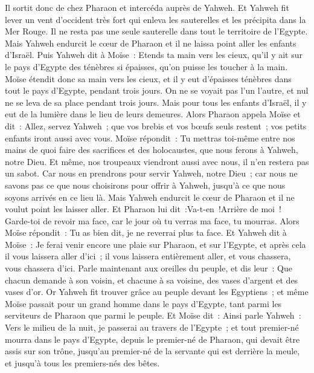 \begin{multicols}{2}
Il sortit donc de chez Pharaon et intercéda auprès de Yahweh.
Et Yahweh fit lever un vent d'occident très fort qui enleva les sauterelles et les précipita dans la Mer Rouge. Il ne resta pas une seule sauterelle dans tout le territoire de l'Egypte.
Mais Yahweh endurcit le cœur de Pharaon et il ne laissa point aller les enfants d'Israël.
Puis Yahweh dit à Moïse~: Etends ta main vers les cieux, qu'il y ait sur le pays d'Egypte des ténèbres si épaisses, qu'on puisse les toucher à la main.
Moïse étendit donc sa main vers les cieux, et il y eut d'épaisses ténèbres dans tout le pays d'Egypte, pendant trois jours.
On ne se voyait pas l'un l'autre, et nul ne se leva de sa place pendant trois jours. Mais pour tous les enfants d'Israël, il y eut de la lumière dans le lieu de leurs demeures.
Alors Pharaon appela Moïse et dit~: Allez, servez Yahweh~; que vos brebis et vos bœufs seuls restent~; vos petits enfants iront aussi avec vous.
Moïse répondit~: Tu mettras toi-même entre nos mains de quoi faire des sacrifices et des holocaustes, que nous ferons à Yahweh, notre Dieu.
Et même, nos troupeaux viendront aussi avec nous, il n'en restera pas un sabot. Car nous en prendrons pour servir Yahweh, notre Dieu~; car nous ne savons pas ce que nous choisirons pour offrir à Yahweh, jusqu'à ce que nous soyons arrivés en ce lieu là.
Mais Yahweh endurcit le cœur de Pharaon et il ne voulut point les laisser aller.
Et Pharaon lui dit~:Va-t-en~!Arrière de moi~! Garde-toi de revoir ma face, car le jour où tu verras ma face, tu mourras.
Alors Moïse répondit~: Tu as bien dit, je ne reverrai plus ta face.
\VerseOne{}Et Yahweh dit à Moïse~: Je ferai venir encore une plaie sur Pharaon, et sur l'Egypte, et après cela il vous laissera aller d'ici~; il vous laissera entièrement aller, et vous chassera, vous chassera d'ici.
Parle maintenant aux oreilles du peuple, et dis leur~: Que chacun demande à son voisin, et chacune à sa voisine, des vases d'argent et des vases d'or.
Or Yahweh fit trouver grâce au peuple devant les Egyptiens~; et même Moïse passait pour un grand homme dans le pays d'Egypte, tant parmi les serviteurs de Pharaon que parmi le peuple.
Et Moïse dit~: Ainsi parle Yahweh~: Vers le milieu de la nuit, je passerai au travers de l'Egypte~;
et tout premier-né mourra dans le pays d'Egypte, depuis le premier-né de Pharaon, qui devait être assis sur son trône, jusqu'au premier-né de la servante qui est derrière la meule, et jusqu'à tous les premiers-nés des bêtes.

\end{multicols}
